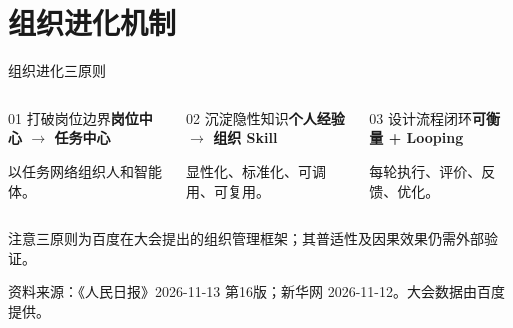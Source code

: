 \documentclass[aspectratio=169,10pt]{ctexbeamer}
\newcommand{\src}{\vfill{\tiny 资料来源：《人民日报》2026-11-13 第16版；新华网 2026-11-12。大会数据由百度提供。}}
\begin{document}
\section{组织进化机制}
\begin{frame}{组织进化三原则}\begin{columns}[T]\begin{block}{01 打破岗位边界}\textbf{岗位中心 $\to$ 任务中心}\par\medskip 以任务网络组织人和智能体。\end{block}\begin{block}{02 沉淀隐性知识}\textbf{个人经验 $\to$ 组织 Skill}\par\medskip 显性化、标准化、可调用、可复用。\end{block}\begin{block}{03 设计流程闭环}\textbf{可衡量 + Looping}\par\medskip 每轮执行、评价、反馈、优化。\end{block}\end{columns}
\vspace{0.6cm}\begin{alertblock}{注意}三原则为百度在大会提出的组织管理框架；其普适性及因果效果仍需外部验证。\end{alertblock}\src\end{frame}
\end{document}
